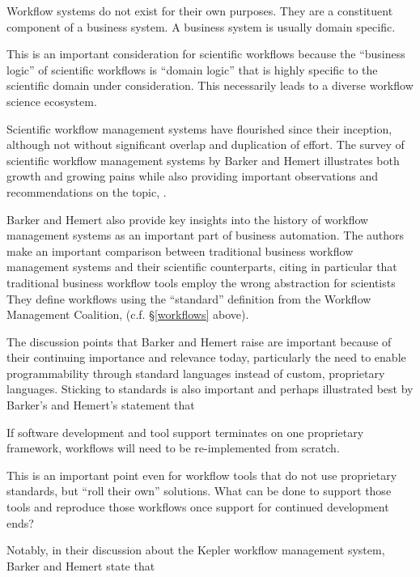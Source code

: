 \begin{displayquote}
Workflow systems do not exist for their own purposes. They
are a constituent component of a business system. A business system is usually domain
specific.
\end{displayquote}

This is an important consideration for scientific workflows because the
``business logic'' of scientific workflows is ``domain logic'' that is
highly specific to the scientific domain under consideration. This
necessarily leads to a diverse workflow science ecosystem.

Scientific workflow management systems have flourished since their
inception, although not without significant overlap and duplication of
effort. The survey of scientific workflow management systems by Barker
and Hemert illustrates both growth and growing pains while also providing
important observations and recommendations on the topic,
\cite{barker_scientific_2007}.

Barker and Hemert also provide key insights into the history of
workflow management systems as an important part of business
automation. The authors make an important comparison between traditional
business workflow management systems and their scientific counterparts,
citing in particular that traditional business workflow tools employ the
wrong abstraction for scientists They define workflows using the
``standard'' definition from the Workflow Management Coalition, (c.f. \S \ref{workflows} above).

The discussion points that Barker and Hemert raise are important because
of their continuing importance and relevance today, particularly the
need to enable programmability through standard languages instead of
custom, proprietary languages. Sticking to
standards is also important and perhaps illustrated best by Barker's and
Hemert's statement that

\begin{displayquote}
If software development and tool support terminates on one proprietary 
framework, workflows will need to be re-implemented from scratch.
\end{displayquote}

This is an important point even for workflow tools that do not use
proprietary standards, but ``roll their own'' solutions. What can be
done to support those tools and reproduce those workflows once support
for continued development ends?

Notably, in their discussion about the Kepler workflow management
system, Barker and Hemert state that

